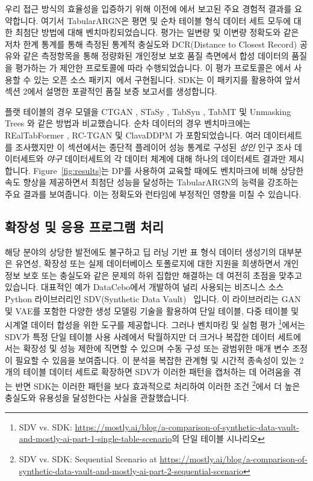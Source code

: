 우리 접근 방식의 효율성을 입증하기 위해 이전에 \cite{tabularargn}에서 보고된 주요 경험적 결과를 요약합니다. 여기서 TabularARGN은 평면 및 순차 테이블 형식 데이터 세트 모두에 대한 최첨단 방법에 대해 벤치마킹되었습니다.
평가는 일변량 및 이변량 정확도와 같은 저차 한계 통계를 통해 측정된 통계적 충실도와 DCR(Distance to Closest Record) 공유와 같은 측정항목을 통해 정량화된 개인정보 보호 품질 측면에서 합성 데이터의 품질을 평가하는 \cite{pla21-qa}가 제안한 프로토콜에 따라 수행되었습니다.
이 평가 프로토콜은 \cite{mostlyai-qa}에서 사용할 수 있는 오픈 소스 패키지~\cite{qareport}에서 구현됩니다.
SDK는 이 패키지를 활용하여 앞서 섹션 2에서 설명한 포괄적인 품질 보증 보고서를 생성합니다.

플랫 테이블의 경우 모델을 CTGAN \cite{xu19}, STaSy \cite{kim23-StaSy}, TabSyn \cite{zha24-TabSyn}, TabMT \cite{gul23-TabMT} 및 Unmasking Trees \cite{mcc24-UnmaskingTrees}와 같은 방법과 비교했습니다. 순차 데이터의 경우 벤치마크에는 REalTabFormer \cite{sol23-Realtabformer}, RC-TGAN \cite{gue23-rctgan} 및 ClavaDDPM \cite{pan24-clavaddpm}가 포함되었습니다.
여러 데이터세트를 조사했지만 이 섹션에서는 종단적 플레이어 성능 통계로 구성된 \emph{성인} 인구 조사 데이터세트와 \emph{야구} 데이터세트의 각 데이터 체계에 대해 하나의 데이터세트 결과만 제시합니다.
Figure~\ref{fig:results}는 DP를 사용하여 교육할 때에도 벤치마크에 비해 상당한 속도 향상을 제공하면서 최첨단 성능을 달성하는 TabularARGN의 능력을 강조하는 주요 결과를 보여줍니다. 이는 정확도와 런타임에 부정적인 영향을 미칠 수 있습니다.


\subsection{확장성 및 응용 프로그램 처리}
해당 분야의 상당한 발전에도 불구하고 딥 러닝 기반 표 형식 데이터 생성기의 대부분은 유연성, 확장성 또는 실제 데이터베이스 토폴로지에 대한 지원을 희생하면서 개인 정보 보호 또는 충실도와 같은 문제의 하위 집합만 해결하는 데 여전히 초점을 맞추고 있습니다. 대표적인 예가 DataCebo에서 개발하여 널리 사용되는 비즈니스 소스 Python 라이브러리인 SDV(Synthetic Data Vault) ~\cite{pat16-sdv}입니다. 이 라이브러리는 GAN 및 VAE를 포함한 다양한 생성 모델링 기술을 활용하여 단일 테이블, 다중 테이블 및 시계열 데이터 합성을 위한 도구를 제공합니다. 그러나 벤치마킹 및 실험 평가 \footnote{SDV vs. SDK: \url{https://mostly.ai/blog/a-comparison-of-synthetic-data-vault-and-mostly-ai-part-1-single-table-scenario}의 단일 테이블 시나리오}에서는 SDV가 특정 단일 테이블 사용 사례에서 탁월하지만 더 크거나 복잡한 데이터 세트에서는 확장성 및 성능 제한에 직면할 수 있으며 수동 구성 또는 광범위한 매개 변수 조정이 필요할 수 있음을 보여줍니다.
이 분석을 복잡한 관계형 및 시간적 종속성이 있는 2개의 테이블 데이터 세트로 확장하면 SDV가 이러한 패턴을 캡처하는 데 어려움을 겪는 반면 SDK는 이러한 패턴을 보다 효과적으로 처리하여 이러한 조건 \footnote{SDV vs. SDK: Sequential Scenario at \url{https://mostly.ai/blog/a-comparison-of-synthetic-data-vault-and-mostly-ai-part-2-sequential-scenario}}에서 더 높은 충실도와 유용성을 달성한다는 사실을 관찰했습니다.


